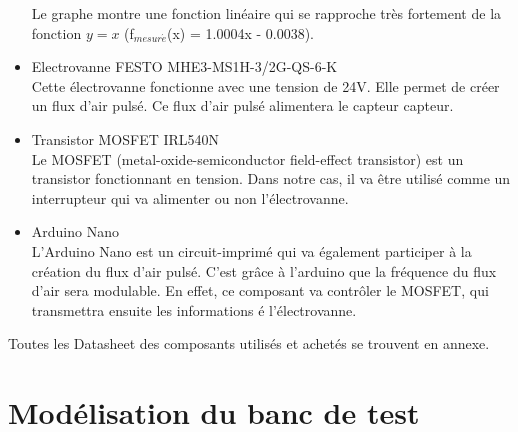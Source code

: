 \begin{itemize}
          Le graphe montre une fonction linéaire qui se rapproche très fortement de la fonction $y = x$ (f$_{mesur\acute{e}}$(x) = 1.0004x - 0.0038).
    \item Electrovanne FESTO MHE3-MS1H-3/2G-QS-6-K\\
          Cette électrovanne fonctionne avec une tension de 24V.  Elle permet de créer un flux d'air pulsé. Ce flux d'air pulsé alimentera le
          capteur \gls{capteur}.
    \item Transistor MOSFET IRL540N\\
          Le MOSFET (metal-oxide-semiconductor field-effect transistor) est un transistor fonctionnant en tension. Dans notre cas, il va
          être utilisé comme un interrupteur qui va alimenter ou non l'électrovanne.
    \item Arduino Nano\\
          L'Arduino Nano est un circuit-imprimé qui va également participer à la création du flux d'air pulsé. C'est grâce à l'arduino que la
          fréquence du flux d'air sera modulable. En effet, ce composant va contrôler le MOSFET, qui transmettra ensuite les informations é l'électrovanne.
\end{itemize}

Toutes les Datasheet des composants utilisés et achetés se trouvent en annexe. \\

\section{Modélisation du banc de test}
